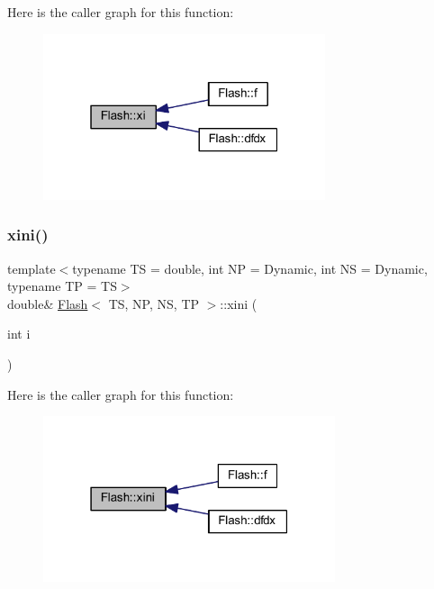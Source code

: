 Here is the caller graph for this function\+:
\nopagebreak
\begin{figure}[H]
\begin{center}
\leavevmode
\includegraphics[width=235pt]{class_flash_a289586a8a31a503bd4f96ea9455f235e_icgraph}
\end{center}
\end{figure}
\mbox{\label{class_flash_ade19a84735d622bd8fcc10bc37ed5cdd}} 
\subsubsection{\texorpdfstring{xini()}{xini()}}
{\footnotesize\ttfamily template$<$typename TS = double, int NP = Dynamic, int NS = Dynamic, typename TP = TS$>$ \\
double\& \mbox{\hyperlink{class_flash}{Flash}}$<$ TS, NP, NS, TP $>$\+::xini (\begin{DoxyParamCaption}\item[{int}]{i }\end{DoxyParamCaption})\hspace{0.3cm}{\ttfamily [inline]}}

Here is the caller graph for this function\+:
\nopagebreak
\begin{figure}[H]
\begin{center}
\leavevmode
\includegraphics[width=243pt]{class_flash_ade19a84735d622bd8fcc10bc37ed5cdd_icgraph}
\end{center}
\end{figure}
\mbox{\label{class_flash_a2af985b9562aa54cbc5c3dfd2f4292ef}} 
